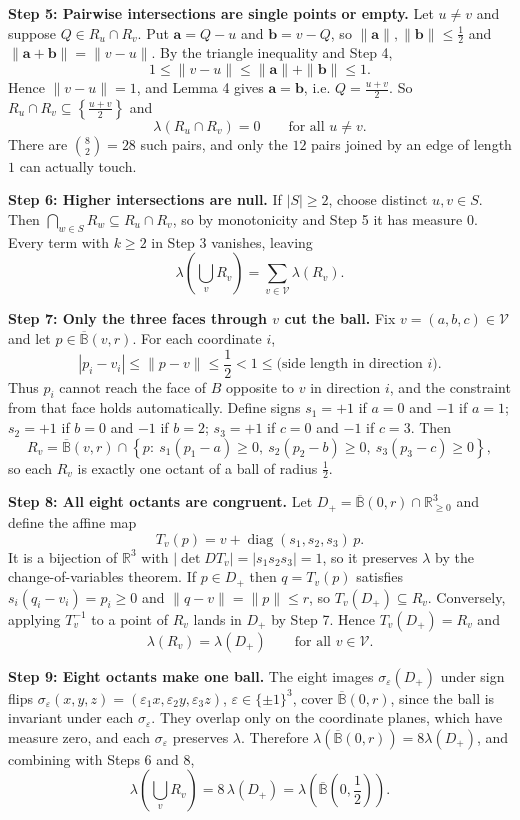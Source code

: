 \begin{enumerate}
 \textbf{Step 5: Pairwise intersections are single points or empty.} Let $u\ne v$ and suppose $Q\in R_u\cap R_v$. Put $\mathbf{a}=Q-u$ and $\mathbf{b}=v-Q$, so $\|\mathbf{a}\|,\|\mathbf{b}\|\le\frac12$ and $\|\mathbf{a}+\mathbf{b}\|=\|v-u\|$. By the triangle inequality and Step 4,
 \[1\le\|v-u\|\le\|\mathbf{a}\|+\|\mathbf{b}\|\le1.\]Hence $\|v-u\|=1$, and Lemma 4 gives $\mathbf{a}=\mathbf{b}$, i.e. $Q=\frac{u+v}{2}$. So $R_u\cap R_v\subseteq\left\{\frac{u+v}{2}\right\}$ and
 \[\lambda(R_u\cap R_v)=0\qquad\text{for all }u\ne v.\]There are $\binom82=28$ such pairs, and only the $12$ pairs joined by an edge of length $1$ can actually touch.

 \textbf{Step 6: Higher intersections are null.} If $|S|\ge2$, choose distinct $u,v\in S$. Then $\bigcap_{w\in S}R_w\subseteq R_u\cap R_v$, so by monotonicity and Step 5 it has measure $0$. Every term with $k\ge2$ in Step 3 vanishes, leaving
 \[\lambda\left(\bigcup_vR_v\right)=\sum_{v\in\mathcal{V}}\lambda(R_v).\]

 \textbf{Step 7: Only the three faces through $v$ cut the ball.} Fix $v=(a,b,c)\in\mathcal{V}$ and let $p\in\overline{\mathbb{B}}(v,r)$. For each coordinate $i$,
 \[|p_i-v_i|\le\|p-v\|\le\frac12<1\le\text{(side length in direction }i).\]Thus $p_i$ cannot reach the face of $B$ opposite to $v$ in direction $i$, and the constraint from that face holds automatically. Define signs $s_1=+1$ if $a=0$ and $-1$ if $a=1$; $s_2=+1$ if $b=0$ and $-1$ if $b=2$; $s_3=+1$ if $c=0$ and $-1$ if $c=3$. Then
 \[R_v=\overline{\mathbb{B}}(v,r)\cap\left\{p:\ s_1(p_1-a)\ge0,\ s_2(p_2-b)\ge0,\ s_3(p_3-c)\ge0\right\},\]so each $R_v$ is exactly one octant of a ball of radius $\frac12$.

 \textbf{Step 8: All eight octants are congruent.} Let $D_+=\overline{\mathbb{B}}(0,r)\cap\mathbb{R}^3_{\ge0}$ and define the affine map
 \[T_v(p)=v+\operatorname{diag}(s_1,s_2,s_3)\,p.\]It is a bijection of $\mathbb{R}^3$ with $|\det DT_v|=|s_1s_2s_3|=1$, so it preserves $\lambda$ by the change-of-variables theorem. If $p\in D_+$ then $q=T_v(p)$ satisfies $s_i(q_i-v_i)=p_i\ge0$ and $\|q-v\|=\|p\|\le r$, so $T_v(D_+)\subseteq R_v$. Conversely, applying $T_v^{-1}$ to a point of $R_v$ lands in $D_+$ by Step 7. Hence $T_v(D_+)=R_v$ and
 \[\lambda(R_v)=\lambda(D_+)\qquad\text{for all }v\in\mathcal{V}.\]

 \textbf{Step 9: Eight octants make one ball.} The eight images $\sigma_\varepsilon(D_+)$ under sign flips $\sigma_\varepsilon(x,y,z)=(\varepsilon_1x,\varepsilon_2y,\varepsilon_3z)$, $\varepsilon\in\{\pm1\}^3$, cover $\overline{\mathbb{B}}(0,r)$, since the ball is invariant under each $\sigma_\varepsilon$. They overlap only on the coordinate planes, which have measure zero, and each $\sigma_\varepsilon$ preserves $\lambda$. Therefore $\lambda\left(\overline{\mathbb{B}}(0,r)\right)=8\lambda(D_+)$, and combining with Steps 6 and 8,
 \[\lambda\left(\bigcup_vR_v\right)=8\,\lambda(D_+)=\lambda\left(\overline{\mathbb{B}}\left(0,\frac12\right)\right).\]


\end{enumerate}
